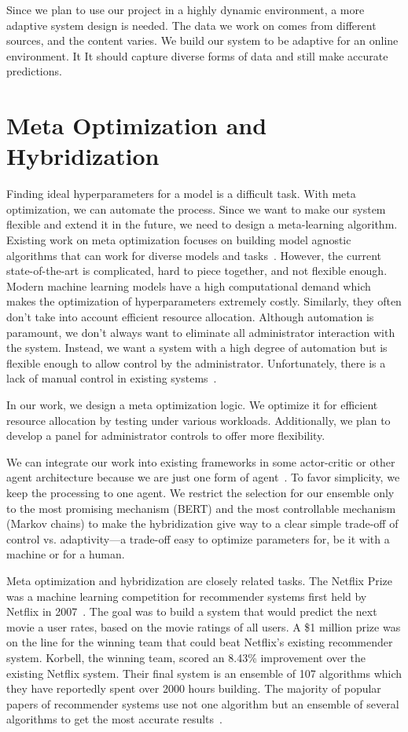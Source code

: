 Since we plan to use our project in a highly dynamic environment, a more adaptive system design is needed. The data we work on comes from different sources, and the content varies. We build our system to be adaptive for an online environment. It It should capture diverse forms of data and still make accurate predictions.


\section{Meta Optimization and Hybridization}
Finding ideal hyperparameters for a model is a difficult task. With meta optimization, we can automate the process. Since we want to make our system flexible and extend it in the future, we need to design a meta-learning algorithm. Existing work on meta optimization focuses on building model agnostic algorithms that can work for diverse models and tasks~\cite{finn2017model}. However, the current state-of-the-art is complicated, hard to piece together, and not flexible enough. Modern machine learning models have a high computational demand which makes the optimization of hyperparameters extremely costly\cite{falkner2018bohb}. Similarly, they often don't take into account efficient resource allocation. Although automation is paramount, we don't always want to eliminate all administrator interaction with the system. Instead, we want a system with a high degree of automation but is flexible enough to allow control by the administrator. Unfortunately, there is a lack of manual control in existing systems~\cite{feurer2019hyperparameter}.

In our work, we design a meta optimization logic. We optimize it for efficient resource allocation by testing under various workloads. Additionally, we plan to develop a panel for administrator controls to offer more flexibility.

We can integrate our work into existing frameworks in some actor-critic or other agent architecture because we are just one form of agent~\cite{lee2021sunrise}. To favor simplicity, we keep the processing to one agent. We restrict the selection for our ensemble only to the most promising mechanism (BERT) and the most controllable mechanism (Markov chains) to make the hybridization give way to a clear simple trade-off of control vs. adaptivity---a trade-off easy to optimize parameters for, be it with a machine or for a human.

Meta optimization and hybridization are closely related tasks. The Netflix Prize was a machine learning competition for recommender systems first held by Netflix in 2007~\cite{Netflixprize}. The goal was to build a system that would predict the next movie a user rates, based on the movie ratings of all users. A \$1 million prize was on the line for the winning team that could beat Netflix's existing recommender system. Korbell, the winning team, scored an 8.43\% improvement over the existing Netflix system. Their final system is an ensemble of 107 algorithms which they have reportedly spent over 2000 hours building. The majority of popular papers of recommender systems use not one algorithm but an ensemble of several algorithms to get the most accurate results~\cite{portugal2018use}. 

